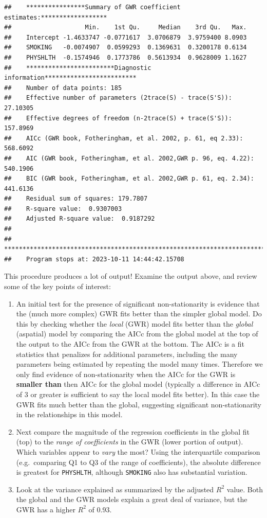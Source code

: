 \documentclass[
]{book}
\providecommand{\tightlist}{%
  \setlength{\itemsep}{0pt}\setlength{\parskip}{0pt}}
\begin{document}
\begin{verbatim}
##    ****************Summary of GWR coefficient estimates:******************
##                    Min.    1st Qu.     Median    3rd Qu.   Max.
##    Intercept -1.4633747 -0.0771617  3.0706879  3.9759400 8.0903
##    SMOKING   -0.0074907  0.0599293  0.1369631  0.3200178 0.6134
##    PHYSHLTH  -0.1574946  0.1773786  0.5613934  0.9628009 1.1627
##    ************************Diagnostic information*************************
##    Number of data points: 185 
##    Effective number of parameters (2trace(S) - trace(S'S)): 27.10305 
##    Effective degrees of freedom (n-2trace(S) + trace(S'S)): 157.8969 
##    AICc (GWR book, Fotheringham, et al. 2002, p. 61, eq 2.33): 568.6092 
##    AIC (GWR book, Fotheringham, et al. 2002,GWR p. 96, eq. 4.22): 540.1906 
##    BIC (GWR book, Fotheringham, et al. 2002,GWR p. 61, eq. 2.34): 441.6136 
##    Residual sum of squares: 179.7807 
##    R-square value:  0.9307003 
##    Adjusted R-square value:  0.9187292 
## 
##    ***********************************************************************
##    Program stops at: 2023-10-11 14:44:42.15708
\end{verbatim}

This procedure produces a lot of output! Examine the output above, and review some of the key points of interest:

\begin{enumerate}
\def\labelenumi{\arabic{enumi}.}
\tightlist
\item
  An initial test for the presence of significant non-stationarity is evidence that the (much more complex) GWR fits better than the simpler global model. Do this by checking whether the \emph{local} (GWR) model fits better than the \emph{global} (aspatial) model by comparing the AICc from the global model at the top of the output to the AICc from the GWR at the bottom. The AICc is a fit statistics that penalizes for additional parameters, including the many parameters being estimated by repeating the model many times. Therefore we only find evidence of non-stationarity when the AICc for the GWR is \textbf{smaller than} then AICc for the global model (typically a difference in AICc of 3 or greater is sufficient to say the local model fits better). In this case the GWR fits much better than the global, suggesting significant non-stationarity in the relationships in this model.
\item
  Next compare the magnitude of the regression coefficients in the global fit (top) to the \emph{range of coefficients} in the GWR (lower portion of output). Which variables appear to \emph{vary} the most? Using the interquartile comparison (e.g.~comparing Q1 to Q3 of the range of coefficients), the absolute difference is greatest for \texttt{PHYSHLTH}, although \texttt{SMOKING} also has substantial variation.
\item
  Look at the variance explained as summarized by the adjusted \(R^2\) value. Both the global and the GWR models explain a great deal of variance, but the GWR has a higher \(R^2\) of 0.93.
\end{enumerate}
\end{document}
